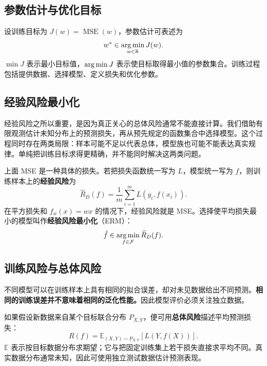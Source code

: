 \subsection{参数估计与优化目标}

设训练目标为 $J(w)=\operatorname{MSE}(w)$，参数估计可表述为
\[
w^*\in\operatorname*{arg\,min}_{w\in\mathbb R}J(w).
\]
$\min J$ 表示最小目标值，$\operatorname*{arg\,min} J$ 表示使目标取得最小值的参数集合。训练过程包括提供数据、选择模型、定义损失和优化参数。

\subsection{经验风险最小化}

经验风险之所以重要，是因为真正关心的总体风险通常不能直接计算。我们借助有限观测估计未知分布上的预测损失，再从预先规定的函数集合中选择模型。这个过程同时存在两类局限：样本可能不足以代表总体，模型族也可能不能表达真实规律。单纯把训练目标求得更精确，并不能同时解决这两类问题。

上面 MSE 是一种具体的损失。若把损失函数统一写为 $L$，模型统一写为 $f$，则训练样本上的\textbf{经验风险}为
\begin{equation}\label{eq:empirical-risk}
\widehat R_D(f)=\frac1m\sum_{i=1}^{m}L(y_i,f(x_i)).
\end{equation}
在平方损失和 $f_w(x)=wx$ 的情况下，经验风险就是 MSE。选择使平均损失最小的模型叫作\textbf{经验风险最小化}（ERM）：
\begin{equation}\label{eq:erm}
\hat f\in\operatorname*{arg\,min}_{f\in\mathcal F}\widehat R_D(f).
\end{equation}

\subsection{训练风险与总体风险}

不同模型可以在训练样本上具有相同的拟合误差，却对未见数据给出不同预测。\textbf{相同的训练误差并不意味着相同的泛化性能。}因此模型评价必须关注独立数据。

如果假设新数据来自某个目标联合分布 $P_{X,Y}$，便可用\textbf{总体风险}描述平均预测损失：
\begin{equation}\label{eq:population-risk}
R(f)=\mathbb E_{(X,Y)\sim P_{X,Y}}[L(Y,f(X))].
\end{equation}
$\mathbb E$ 表示按目标数据分布求期望；它与把固定训练集上若干损失直接求平均不同。真实数据分布通常未知，因此可使用独立测试数据估计预测表现。
